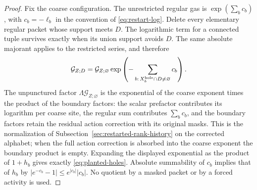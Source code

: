\begin{proof}
Fix the coarse configuration. The unrestricted regular gas is
$\exp(\sum_b c_b)$, with $c_b=-\ell_b$ in the convention of
\eqref{eq:restart-log}. Delete every elementary regular packet
whose support meets $D$. The logarithmic term for a connected tuple
survives exactly when its union support avoids $D$. The same absolute
majorant applies to the restricted series, and therefore
\[
 \mathcal G_{Z;D}
 =\mathcal G_{Z;\varnothing}
   \exp\left(-\sum_{b:\,X_b^{\rm hole}\cap D\ne\varnothing}c_b\right).
\]
The unpunctured factor $\Lambda\mathcal G_{Z;\varnothing}$
is the exponential of the coarse exponent times the product of
the boundary factors: the scalar prefactor contributes its logarithm
per coarse site, the regular sum contributes $\sum_b c_b$, and the
boundary factors retain the residual action correction with its
original masks. This is the normalization of
Subsection~\ref{sec:restarted-rank-history} on the corrected alphabet;
when the full action correction is absorbed into the coarse exponent
the boundary product is empty. Expanding the displayed exponential
as the product of $1+h_b$ gives exactly \eqref{eq:planted-holes}.
Absolute summability of $c_b$ implies that of $h_b$ by
$|e^{-c_b}-1|\le e^{|c_b|}|c_b|$. No quotient by a masked packet
or by a forced activity is used.
\end{proof}

